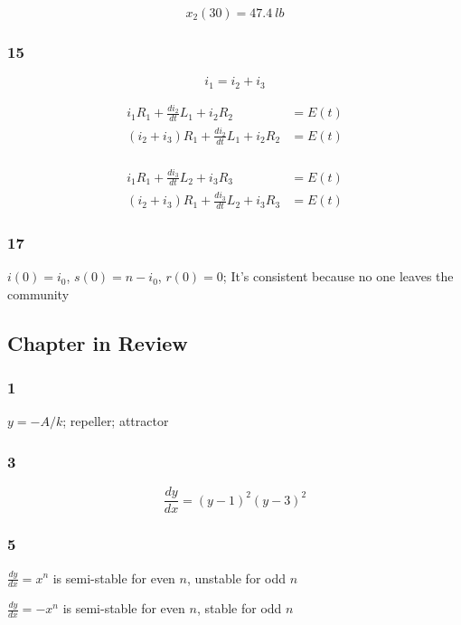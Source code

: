 \documentclass{article}
\begin{document}
\begin{enumerate}
        \[x_2(30) = \qty{47.4}{lb}\]
\end{enumerate}

\subsubsection{15}

\[i_1 = i_2 + i_3\]

\begin{align*}
  i_1 R_1 + \frac{di_2}{dt} L_1 + i_2 R_2         & = E(t) \\
  (i_2 + i_3) R_1 + \frac{di_2}{dt} L_1 + i_2 R_2 & = E(t) \\
\end{align*}

\begin{align*}
  i_1 R_1 + \frac{di_3}{dt} L_2 + i_3 R_3         & = E(t) \\
  (i_2 + i_3) R_1 + \frac{di_3}{dt} L_2 + i_3 R_3 & = E(t)
\end{align*}

\subsubsection{17}

$i(0) = i_0$, $s(0) = n - i_0$, $r(0) = 0$; It's consistent because no one leaves the community

\subsection{Chapter in Review}

\subsubsection{1}

$y = -A / k$; repeller; attractor

\subsubsection{3}

\[\frac{dy}{dx} = (y - 1)^2 (y - 3)^2\]

\subsubsection{5}

$\frac{dy}{dx} = x^n$ is semi-stable for even $n$, unstable for odd $n$

$\frac{dy}{dx} = -x^n$ is semi-stable for even $n$, stable for odd $n$
\end{document}
